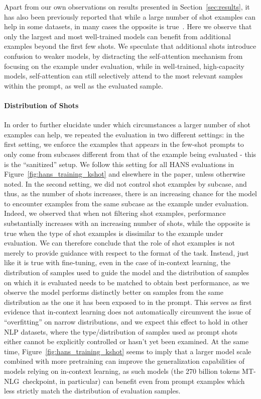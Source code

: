 \documentclass[11pt]{article}
\newcommand{\ours}{MT-NLG}
\begin{document}
Apart from our own observations on results presented in Section~\ref{sec:results}, it has also been previously reported that while a large number of shot examples can help in some datasets, in many cases the opposite is true~\cite{brown2020language}. Here we observe that only the largest and most well-trained models can benefit from additional examples beyond the first few shots. We speculate that additional shots introduce confusion to weaker models, by distracting the self-attention mechanism from focusing on the example under evaluation, while in well-trained, high-capacity models, self-attention can still selectively attend to the most relevant samples within the prompt, as well as the evaluated sample.

\paragraph{Distribution of Shots} In order to further elucidate under which circumstances a larger number of shot examples can help, we repeated the evaluation in two different settings: in the first setting, we enforce the examples that appears in the few-shot prompts to only come from subcases different from that of the example being evaluated - this is the ``sanitized'' setup. We follow this setting for all HANS evaluations in Figure~\ref{fig:hans_training_kshot} and elsewhere in the paper, unless otherwise noted. In the second setting, we did not control shot examples by subcase, and thus, as the number of shots increases, there is an increasing chance for the model to encounter examples from the same subcase as the example under evaluation. Indeed, we observed that when not filtering shot examples, performance substantially increases with an increasing number of shots, while the opposite is true when the type of shot examples is dissimilar to the example under evaluation. We can therefore conclude that the role of shot examples is not merely to provide guidance with respect to the format of the task. Instead, just like it is true with fine-tuning, even in the case of in-context learning, the distribution of samples used to guide the model and the distribution of samples on which it is evaluated needs to be matched to obtain best performance, as we observe the model performs distinctly better on samples from the same distribution as the one it has been exposed to in the prompt. This serves as first evidence that in-context learning does not automatically circumvent the issue of ``overfitting'' on narrow distributions, and we expect this effect to hold in other NLP datasets, where the type/distribution of samples used as prompt shots either cannot be explicitly controlled or hasn't yet been examined. At the same time, Figure~\ref{fig:hans_training_kshot} seems to imply that a larger model scale combined with more pretraining can improve the generalization capabilities of models relying on in-context learning, as such models (the 270 billion tokens \ours~checkpoint, in particular) can benefit even from prompt examples which less strictly match the distribution of evaluation samples.
\end{document}
